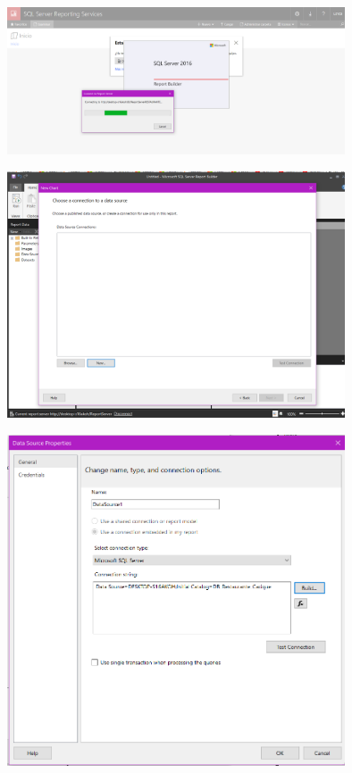 	\begin{center}
	\includegraphics[width=10cm]{./Imagenes/ley4} 
	\end{center}

	\begin{center}
	\includegraphics[width=10cm]{./Imagenes/ley6} 
	\end{center}

	\begin{center}
	\includegraphics[width=10cm]{./Imagenes/ley7} 
	\end{center}

